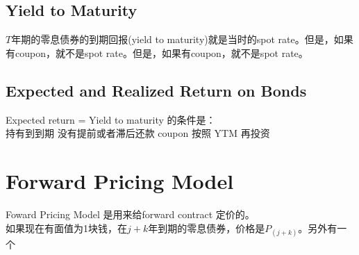 \documentclass[cn,11pt,chinese]{elegantbook}
\begin{document}
    \subsection{Yield to Maturity}
        \(T\)年期的零息债券的到期回报(yield to maturity)就是当时的spot rate。但是，如果有coupon，就不是spot rate。但是，如果有coupon，就不是spot rate。

    \subsection{Expected and Realized Return on Bonds}
        Expected return = Yield to maturity 的条件是：\\
        \indent 持有到到期 \indent 没有提前或者滞后还款 \indent coupon 按照 YTM 再投资

    \section{Forward Pricing Model}
        Foward Pricing Model 是用来给forward contract 定价的。\\
        如果现在有面值为1块钱，在\(j + k\)年到期的零息债券，价格是\(P_{(j + k)}\)。另外有一个
\end{document}

